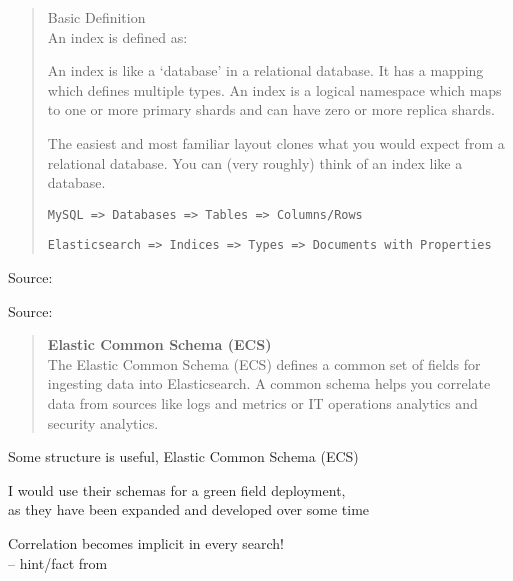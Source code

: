 \documentclass[Screen16to9,17pt]{foils}
\begin{document}

\begin{quote}
Basic Definition\\
An index is defined as:

An index is like a ‘database’ in a relational database. It has a mapping which defines multiple types.
An index is a logical namespace which maps to one or more primary shards and can have zero or more replica shards.

\vskip 5mm

The easiest and most familiar layout clones what you would expect from a relational database. You can (very roughly) think of an index like a database.

\verb+MySQL => Databases => Tables => Columns/Rows+

\verb+Elasticsearch => Indices => Types => Documents with Properties+
\end{quote}
Source: 


Source: 






\begin{quote}{\bf
Elastic Common Schema (ECS)}\\
The Elastic Common Schema (ECS) defines a common set of fields for ingesting data into Elasticsearch. A common schema helps you correlate data from sources like logs and metrics or IT operations analytics and security analytics.
\end{quote}

\begin{list2}

\item Some structure is useful, Elastic Common Schema (ECS)\\
\item I would use their schemas for a green field deployment,\\
  as they have been expanded and developed over some time
\item Correlation becomes implicit in every search!\\
-- hint/fact from {\small{}}
\end{list2}
\end{document}
